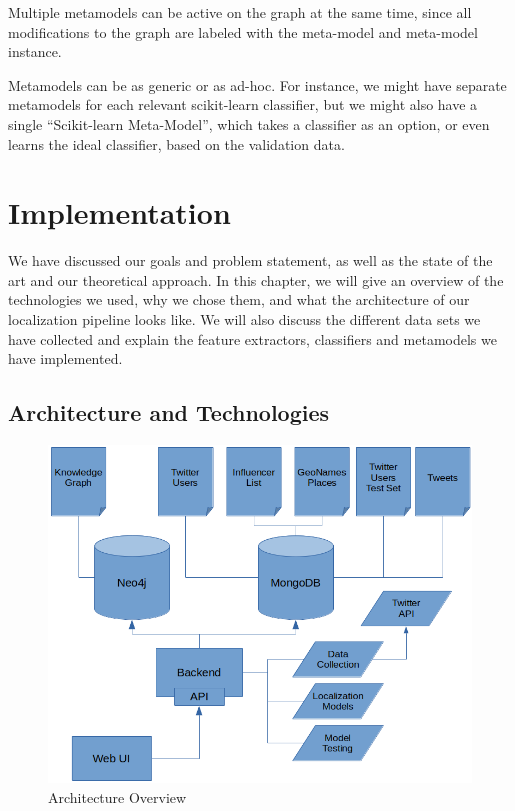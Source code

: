 \documentclass[10pt,a4paper]{article}
\begin{document}
Multiple metamodels can be active on the graph at the same time, since all modifications to the graph are labeled with the meta-model and meta-model instance.

Metamodels can be as generic or as ad-hoc. For instance, we might have separate metamodels for each relevant scikit-learn classifier, but we might also have a single “Scikit-learn Meta-Model”, which takes a classifier as an option, or even learns the ideal classifier, based on the validation data.

\section{Implementation}
We have discussed our goals and problem statement, as well as the state of the art and our theoretical approach. In this chapter, we will give an overview of the technologies we used, why we chose them, and what the architecture of our localization pipeline looks like. We will also discuss the different data sets we have collected and explain the feature extractors, classifiers and metamodels we have implemented.

\subsection{Architecture and Technologies}
\begin{figure}[!htb]
	\centering
	\includegraphics[scale=0.45]{architecture_overview}
	\caption{Architecture Overview}
	\label{fig:architecture-overview}
\end{figure}
\end{document}
